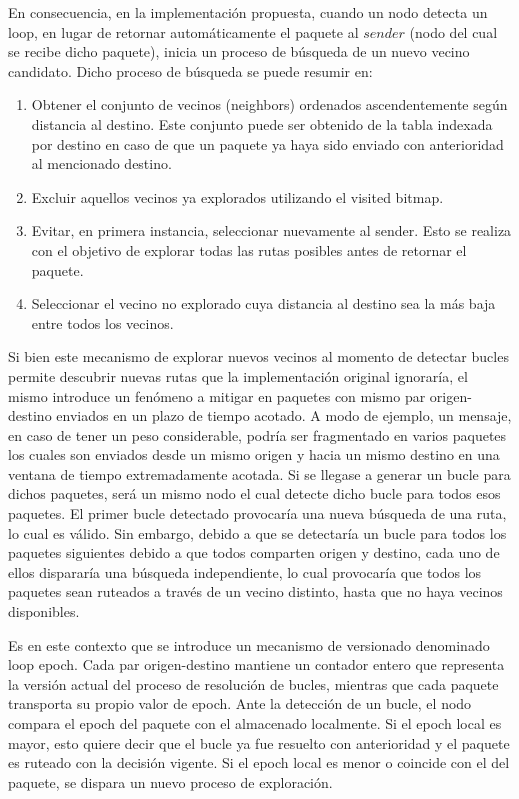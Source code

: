 En consecuencia, en la implementación propuesta, cuando un nodo detecta un loop, en lugar de retornar automáticamente el paquete al $sender$ (nodo del cual se recibe dicho paquete), inicia un proceso de búsqueda de un nuevo vecino candidato. Dicho proceso de búsqueda se puede resumir en:

\begin{enumerate}
    \item Obtener el conjunto de vecinos (neighbors) ordenados ascendentemente según distancia al destino. Este conjunto puede ser obtenido de la tabla indexada por destino en caso de que un paquete ya haya sido enviado con anterioridad al mencionado destino.
    \item Excluir aquellos vecinos ya explorados utilizando el visited bitmap.
    \item Evitar, en primera instancia, seleccionar nuevamente al sender. Esto se realiza con el objetivo de explorar todas las rutas posibles antes de retornar el paquete.
    \item Seleccionar el vecino no explorado cuya distancia al destino sea la más baja entre todos los vecinos.
\end{enumerate}

Si bien este mecanismo de explorar nuevos vecinos al momento de detectar bucles permite descubrir nuevas rutas que la implementación original ignoraría, el mismo introduce un fenómeno a mitigar en paquetes con mismo par origen-destino enviados en un plazo de tiempo acotado. A modo de ejemplo, un mensaje, en caso de tener un peso considerable, podría ser fragmentado en varios paquetes los cuales son enviados desde un mismo origen y hacia un mismo destino en una ventana de tiempo extremadamente acotada. Si se llegase a generar un bucle para dichos paquetes, será un mismo nodo el cual detecte dicho bucle para todos esos paquetes. El primer bucle detectado provocaría una nueva búsqueda de una ruta, lo cual es válido. Sin embargo, debido a que se detectaría un bucle para todos los paquetes siguientes debido a que todos comparten origen y destino, cada uno de ellos dispararía una búsqueda independiente, lo cual provocaría que todos los paquetes sean ruteados a través de un vecino distinto, hasta que no haya vecinos disponibles.

Es en este contexto que se introduce un mecanismo de versionado denominado loop epoch. Cada par origen-destino mantiene un contador entero que representa la versión actual del proceso de resolución de bucles, mientras que cada paquete transporta su propio valor de epoch. Ante la detección de un bucle, el nodo compara el epoch del paquete con el almacenado localmente. Si el epoch local es mayor, esto quiere decir que el bucle ya fue resuelto con anterioridad y el paquete es ruteado con la decisión vigente. Si el epoch local es menor o coincide con el del paquete, se dispara un nuevo proceso de exploración.

